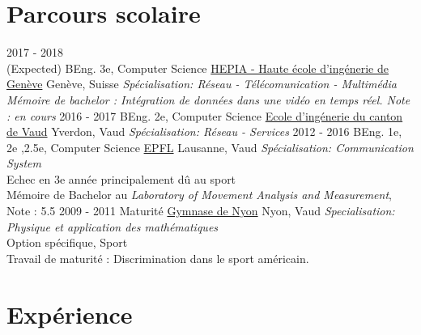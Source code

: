 \documentclass[letterpaper]{twentysecondcv} %
\begin{document}
	
	\makeprofile %
	
	\section{Parcours scolaire}
	
	\begin{twenty} %
		\twentyitem
		{2017 - 2018 \\ (Expected)}
		{BEng. 3e, Computer Science}
		{\href{http://hepia.hesge.ch/}{HEPIA - Haute école d'ingénerie de Genève}}
		{Genève, Suisse}
		{\textit{Spécialisation: Réseau - Télécomunication - Multimédia \\
				Mémoire de bachelor : Intégration de données dans une vidéo en temps réel. Note : en cours}}
		\twentyitem
		{2016 - 2017}
		{BEng. 2e, Computer Science}
		{\href{https://heig-vd.ch/}{Ecole d'ingénerie du canton de Vaud}}
		{Yverdon, Vaud}
		{\textit{Spécialisation: Réseau - Services}}
		\twentyitem
		{2012 - 2016}
		{BEng. 1e, 2e ,2.5e, Computer Science}
		{\href{https://epfl.ch}{EPFL}}
		{Lausanne, Vaud}
		{\textit{Spécialisation: Communication System} \\
			Echec en 3e année principalement dû au sport\\
			Mémoire de Bachelor au \textit{Laboratory of Movement Analysis and Measurement}, Note : 5.5}
		\twentyitem
		{2009 - 2011}
		{Maturité}
		{\href{https://moodle.gymnyon.vd.ch/}{Gymnase de Nyon}}
		{Nyon, Vaud}
		{\textit{Specialisation: Physique et application des mathématiques}\\
			Option spécifique, Sport\\
			Travail de maturité : Discrimination dans le sport américain.}
		
	\end{twenty}
	
	
	\section{Expérience}
	
\end{document}
